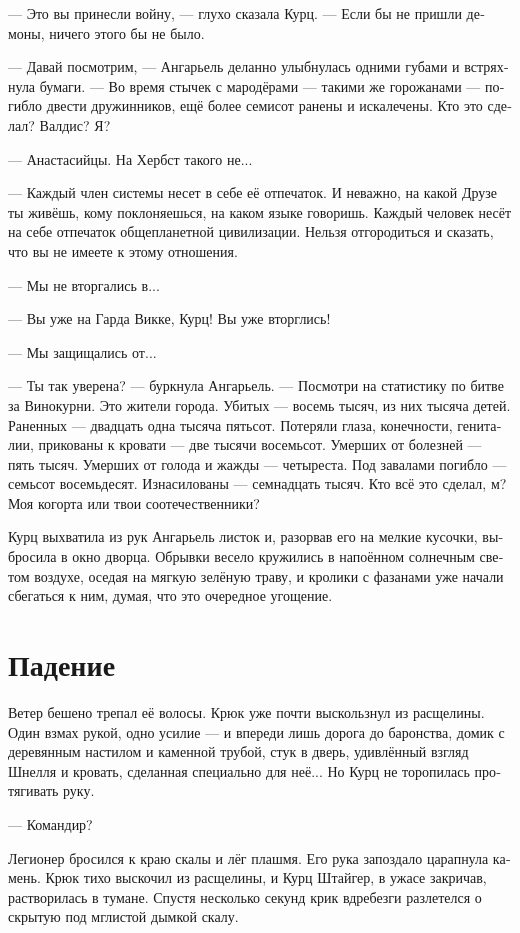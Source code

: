 \documentclass[a4paper,12pt,fleqn]{book}\usepackage{polyglossia}\setdefaultlanguage[babelshorthands=true]{russian}\setotherlanguage{english}\defaultfontfeatures{Ligatures=TeX,Mapping=tex-text}\usepackage{xcolor}\newcommand{\ml}[3]{#2}
\newcommand{\asterism}{\vspace{1em}{\centering\Large\bfseries$\ast~\ast~\ast$\par}\vspace{1em}}
\begin{document}
\asterism

--- Это вы принесли войну, --- глухо сказала Курц.
--- Если бы не пришли демоны, ничего этого бы не было.

--- Давай посмотрим, --- Ангарьель деланно улыбнулась одними губами и встряхнула бумаги.
--- Во время стычек с мародёрами --- такими же горожанами --- погибло двести дружинников, ещё более семисот ранены и искалечены.
Кто это сделал?
Валдис?
Я?

--- Анастасийцы.
На Хербст такого не...

--- Каждый член системы несет в себе её отпечаток.
И неважно, на какой Друзе ты живёшь, кому поклоняешься, на каком языке говоришь.
Каждый человек несёт на себе отпечаток общепланетной цивилизации.
Нельзя отгородиться и сказать, что вы не имеете к этому отношения.

--- Мы не вторгались в...

--- Вы уже на Гарда Викке, Курц!
Вы уже вторглись!

--- Мы защищались от...

--- Ты так уверена? --- буркнула Ангарьель.
--- Посмотри на статистику по битве за Винокурни.
Это жители города.
Убитых --- восемь тысяч, из них тысяча детей.
Раненных --- двадцать одна тысяча пятьсот.
Потеряли глаза, конечности, гениталии, прикованы к кровати --- две тысячи восемьсот.
Умерших от болезней --- пять тысяч.
Умерших от голода и жажды --- четыреста.
Под завалами погибло --- семьсот восемьдесят.
Изнасилованы --- семнадцать тысяч.
Кто всё это сделал, м?
Моя когорта или твои соотечественники?

Курц выхватила из рук Ангарьель листок и, разорвав его на мелкие кусочки, выбросила в окно дворца.
Обрывки весело кружились в напоённом солнечным светом воздухе, оседая на мягкую зелёную траву, и кролики с фазанами уже начали сбегаться к ним, думая, что это очередное угощение.

\section{Падение}

Ветер бешено трепал её волосы.
Крюк уже почти выскользнул из расщелины.
Один взмах рукой, одно усилие --- и впереди лишь дорога до баронства, домик с деревянным настилом и каменной трубой, стук в дверь, удивлённый взгляд Шнелля и кровать, сделанная специально для неё...
Но Курц не торопилась протягивать руку.

--- Командир?

Легионер бросился к краю скалы и лёг плашмя.
Его рука запоздало царапнула камень.
Крюк тихо выскочил из расщелины, и Курц Штайгер, в ужасе закричав, растворилась в тумане.
Спустя несколько секунд крик вдребезги разлетелся о скрытую под мглистой дымкой скалу. 
\end{document}
